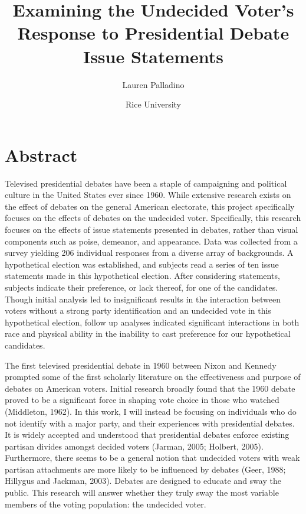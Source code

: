 \documentclass[12pt]{article}
\begin{document}
\title{Examining the Undecided Voter's Response to Presidential Debate Issue Statements}
\author{Lauren Palladino}
\date{Rice University}
\maketitle

\section*{Abstract}

Televised presidential debates have been a staple of campaigning and political culture in the United States ever since 1960. While extensive research exists on the effect of debates on the general American electorate, this project specifically focuses on the effects of debates on the undecided voter. Specifically, this research focuses on the effects of issue statements presented in debates, rather than visual components such as poise, demeanor, and appearance. Data was collected from a survey yielding 206 individual responses from a diverse array of backgrounds. A hypothetical election was established, and subjects read a series of ten issue statements made in this hypothetical election. After considering statements, subjects indicate their preference, or lack thereof, for one of the candidates. Though initial analysis led to insignificant results in the interaction between voters without a strong party identification and an undecided vote in this hypothetical election, follow up analyses indicated significant interactions in both race and physical ability in the inability to cast preference for our hypothetical candidates. \\

\pagebreak

The first televised presidential debate in 1960 between Nixon and Kennedy prompted some of the first scholarly literature on the effectiveness and purpose of debates on American voters. Initial research broadly found that the 1960 debate proved to be a significant force in shaping vote choice in those who watched (Middleton, 1962). In this work, I will instead be focusing on individuals who do not identify with a major party, and their experiences with presidential debates. It is widely accepted and understood that presidential debates enforce existing partisan divides amongst decided voters (Jarman, 2005; Holbert, 2005). Furthermore, there seems to be a general notion that undecided voters with weak partisan attachments are more likely to be influenced by debates (Geer, 1988; Hillygus and Jackman, 2003). Debates are designed to educate and sway the public. This research will  answer whether they truly sway the most variable members of the voting population: the undecided voter.\\
\end{document}
